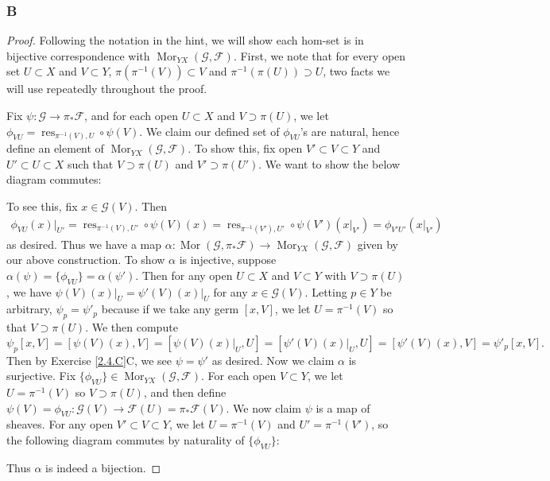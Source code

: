 \documentclass{article}
\newcommand{\fF}{\mathscr{F}}
\newcommand{\fG}{\mathscr{G}}
\DeclareMathOperator{\res}{\mathrm{res}}
\DeclareMathOperator{\Mor}{\mathrm{Mor}}
\begin{document}
\subsubsection{B}\label{2.7.B}
\begin{proof}
    Following the notation in the hint, we will show each hom-set is in bijective correspondence with $\Mor_{YX}(\fG,\fF)$. First, we note that for every open set $U\subset X$ and $V\subset Y$, $\pi(\pi^{-1}(V))\subset V$ and $\pi^{-1}(\pi(U))\supset U$, two facts we will use repeatedly throughout the proof.
    
    Fix $\psi:\fG\to \pi_* \fF$, and for each open $U\subset X$ and $V\supset \pi(U)$, we let $\phi_{VU} = \res_{\pi^{-1}(V),U} \circ \psi(V)$. We claim our defined set of $\phi_{VU}$'s are natural, hence define an element of $\Mor_{YX}(\fG,\fF)$. To show this, fix open $V'\subset V\subset Y$ and $U'\subset U\subset X$ such that $V\supset \pi(U)$ and $V'\supset \pi(U')$. We want to show the below diagram commutes:
    \begin{center}
    \end{center}
    To see this, fix $x\in \fG(V)$. Then 
    \begin{align*}
         \phi_{VU}(x)\vert_{U'} = \res_{\pi^{-1}(V), U'} \circ \psi(V) (x)=\res_{\pi^{-1}(V'),U'}\circ \psi(V')(x\vert_{V'})=\phi_{V'U'}(x\vert_{V'})
    \end{align*}
    as desired. Thus we have a map $\alpha:\Mor(\fG,\pi_* \fF)\to \Mor_{YX}(\fG,\fF)$ given by our above construction. To show $\alpha$ is injective, suppose $\alpha(\psi) = \{\phi_{VU}\} = \alpha(\psi')$. Then for any open $U\subset X$ and $V\subset Y$ with $V\supset \pi(U)$, we have $\psi(V)(x)\vert_U = \psi'(V)(x)\vert_U$ for any $x\in \fG(V)$. Letting $p\in Y$ be arbitrary, $\psi_p=\psi'_p$ because if we take any germ $[x,V]$, we let $U=\pi^{-1}(V)$ so that $V\supset \pi(U)$. We then compute
    \[
    \psi_p[x,V] = [\psi(V)(x), V] = [\psi(V)(x)\vert_U,U]=[\psi'(V)(x)\vert_U,U]=[\psi'(V)(x),V]=\psi'_p[x,V].
    \]
    Then by Exercise \ref{2.4.C}C, we see $\psi=\psi'$ as desired. Now we claim $\alpha$ is surjective. Fix $\{\phi_{VU}\} \in \Mor_{YX}(\fG,\fF)$. For each open $V\subset Y$, we let $U=\pi^{-1}(V)$ so $V\supset \pi(U)$, and then define $\psi(V)=\phi_{VU}:\fG(V)\to \fF(U)=\pi_*\fF(V)$. We now claim $\psi$ is a map of sheaves. For any open $V'\subset V\subset Y$, we let $U=\pi^{-1}(V)$ and $U'=\pi^{-1}(V')$, so the following diagram commutes by naturality of $\{\phi_{VU}\}$:
    \begin{center}
    \end{center}
    Thus $\alpha$ is indeed a bijection.


\end{proof}
\end{document}
